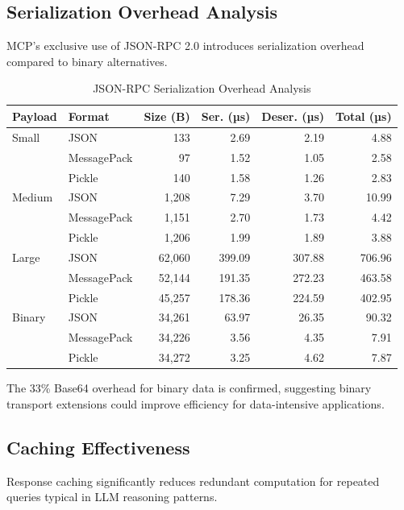 \subsection{Serialization Overhead Analysis}

MCP's exclusive use of JSON-RPC 2.0 introduces serialization overhead compared to binary alternatives.


\begin{table}[h]
\centering
\caption{JSON-RPC Serialization Overhead Analysis}
\label{tab:serialization_benchmark}
\begin{tabular}{llrrrr}
\toprule
\textbf{Payload} & \textbf{Format} & \textbf{Size (B)} & \textbf{Ser. (µs)} & \textbf{Deser. (µs)} & \textbf{Total (µs)} \\
\midrule
Small & JSON & 133 & 2.69 & 2.19 & 4.88 \\
 & MessagePack & 97 & 1.52 & 1.05 & 2.58 \\
 & Pickle & 140 & 1.58 & 1.26 & 2.83 \\
Medium & JSON & 1,208 & 7.29 & 3.70 & 10.99 \\
 & MessagePack & 1,151 & 2.70 & 1.73 & 4.42 \\
 & Pickle & 1,206 & 1.99 & 1.89 & 3.88 \\
Large & JSON & 62,060 & 399.09 & 307.88 & 706.96 \\
 & MessagePack & 52,144 & 191.35 & 272.23 & 463.58 \\
 & Pickle & 45,257 & 178.36 & 224.59 & 402.95 \\
Binary & JSON & 34,261 & 63.97 & 26.35 & 90.32 \\
 & MessagePack & 34,226 & 3.56 & 4.35 & 7.91 \\
 & Pickle & 34,272 & 3.25 & 4.62 & 7.87 \\
\bottomrule
\end{tabular}
\end{table}

The 33\% Base64 overhead for binary data \cite{apipark2025} is confirmed, suggesting binary transport extensions could improve efficiency for data-intensive applications.

\subsection{Caching Effectiveness}

Response caching significantly reduces redundant computation for repeated queries typical in LLM reasoning patterns.


